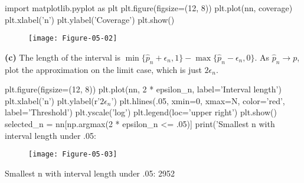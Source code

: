 \begin{python}
import matplotlib.pyplot as plt
plt.figure(figsize=(12, 8))
plt.plot(nn, coverage)
plt.xlabel('n')
plt.ylabel('Coverage')
plt.show()
\end{python}

\begin{figure}[H]
\centering
\texttt{[image: Figure-05-02]}
\end{figure}

\textbf{(c)} The length of the interval is
\(\min \{\hat{p}_{n} + \epsilon_{n}, 1 \} - \max \{ \hat{p}_{n} - \epsilon_{n}, 0\}\).
As \(\hat{p}_{n} \rightarrow p\),  plot the approximation on the
limit case, which is just \(2 \epsilon_{n}\).

\begin{python}
plt.figure(figsize=(12, 8))
plt.plot(nn, 2 * epsilon_n, label='Interval length')
plt.xlabel('n')
plt.ylabel(r'$2\epsilon_{n}$')
plt.hlines(.05, xmin=0, xmax=N, color='red', label='Threshold')
plt.yscale('log')
plt.legend(loc='upper right')
plt.show()
selected_n = nn[np.argmax(2 * epsilon_n <= .05)]
print('Smallest n with interval length under .05: %
\end{python}

\begin{figure}[H]
\centering
\texttt{[image: Figure-05-03]}
\end{figure}

\begin{console}
Smallest n with interval length under .05: 2952
\end{console}
